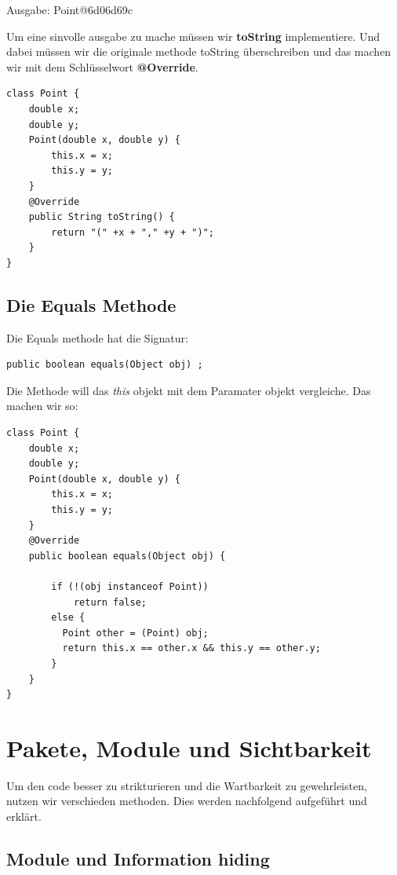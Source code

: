 \documentclass[12pt]{article}
\begin{document}
    Ausgabe: Point@6d06d69c
    
    Um eine sinvolle ausgabe zu mache müssen wir \textbf{toString} implementiere. Und dabei müssen wir die
    originale methode toString überschreiben und das machen wir mit dem Schlüsselwort \textbf{@Override}. 

    \begin{lstlisting}[caption=point]
class Point {
    double x;
    double y;
    Point(double x, double y) {
        this.x = x;
        this.y = y;
    }
    @Override
    public String toString() {
        return "(" +x + "," +y + ")";
    }
}
    \end{lstlisting}

    \subsection*{Die Equals Methode}

    Die Equals methode hat die Signatur: 

    \begin{lstlisting}[caption=Equals]
public boolean equals(Object obj) ;
    \end{lstlisting}

    Die Methode will das \textit{this} objekt mit dem Paramater objekt vergleiche. 
    Das machen wir so: 

    \begin{lstlisting}[caption=equals implementiert]
class Point {
    double x;
    double y;
    Point(double x, double y) {
        this.x = x;
        this.y = y;
    }
    @Override
    public boolean equals(Object obj) {

        if (!(obj instanceof Point))
            return false;
        else {
          Point other = (Point) obj;
          return this.x == other.x && this.y == other.y;
        }
    }
}
    \end{lstlisting}

\section*{Pakete, Module und Sichtbarkeit}

    Um den code besser zu strikturieren und die Wartbarkeit zu gewehrleisten, nutzen wir verschieden methoden. 
    Dies werden nachfolgend aufgeführt und erklärt. 

    \subsection*{Module und Information hiding}
\end{document}
